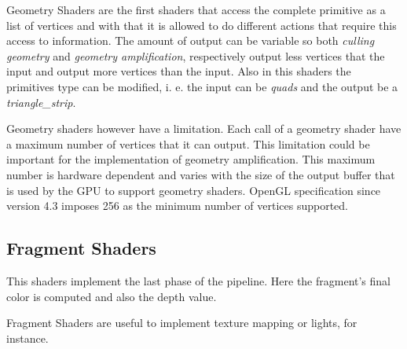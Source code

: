 Geometry Shaders are the first shaders that access the complete primitive as a list of vertices and with that it is allowed to do different actions that require this access to information. The amount of output can be variable so both \emph{culling geometry} and \emph{geometry amplification}, respectively output less vertices that the input and output more vertices than the input. Also in this shaders the primitives type can be modified, i. e. the input can be \emph{quads} and the output be a \emph{triangle\_strip}.

Geometry shaders however have a limitation. Each call of a geometry shader have a maximum number of vertices that it can output. This limitation could be important for the implementation of geometry amplification. This maximum number is hardware dependent and varies with the size of the output buffer that is used by the GPU to support geometry shaders. OpenGL specification since version 4.3 imposes 256 as the minimum number of vertices supported.


\subsection{Fragment Shaders} %
\label{sub:fragment_shaders}
This shaders implement the last phase of the pipeline. Here the fragment's final color is computed and also the depth value.

Fragment Shaders are useful to implement texture mapping or lights, for instance.

